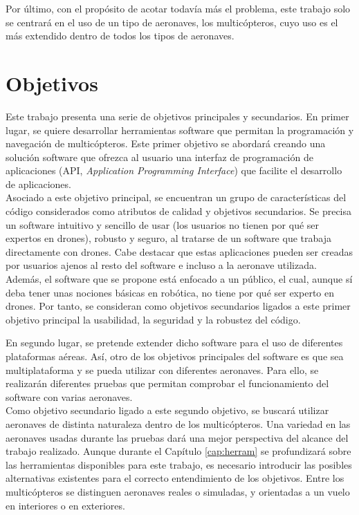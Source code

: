 \documentclass[../main.tex]{subfiles}
\begin{document}
Por último, con el propósito de acotar todavía más el problema, este trabajo solo se centrará en el uso de un tipo de aeronaves, los multicópteros, cuyo uso es el más extendido dentro de todos los tipos de aeronaves.

\section{Objetivos} \label{section:intro-objetivos}
Este trabajo presenta una serie de objetivos principales y secundarios. En primer lugar, se quiere desarrollar herramientas software que permitan la programación y navegación de multicópteros. Este primer objetivo se abordará creando una solución software que ofrezca al usuario una interfaz de programación de aplicaciones (API, \emph{Application Programming Interface}) que facilite el desarrollo de aplicaciones. \\
Asociado a este objetivo principal, se encuentran un grupo de características del código considerados como atributos de calidad y objetivos secundarios. Se precisa un software intuitivo y sencillo de usar (los usuarios no tienen por qué ser expertos en drones), robusto y seguro, al tratarse de un software que trabaja directamente con drones. Cabe destacar que estas aplicaciones pueden ser creadas por usuarios ajenos al resto del software e incluso a la aeronave utilizada. Además, el software que se propone está enfocado a un público, el cual, aunque sí deba tener unas nociones básicas en robótica, no tiene por qué ser experto en drones. Por tanto, se consideran como objetivos secundarios ligados a este primer objetivo principal la usabilidad, la seguridad y la robustez del código.

En segundo lugar, se pretende extender dicho software para el uso de diferentes plataformas aéreas. Así, otro de los objetivos principales del software es que sea multiplataforma y se pueda utilizar con diferentes aeronaves. Para ello, se realizarán diferentes pruebas que permitan comprobar el funcionamiento del software con varias aeronaves. \\
Como objetivo secundario ligado a este segundo objetivo, se buscará utilizar aeronaves de distinta naturaleza dentro de los multicópteros. Una variedad en las aeronaves usadas durante las pruebas dará una mejor perspectiva del alcance del trabajo realizado. Aunque durante el Capítulo  \ref{cap:herram} se profundizará sobre las herramientas disponibles para este trabajo, es necesario introducir las posibles alternativas existentes para el correcto entendimiento de los objetivos. Entre los multicópteros se distinguen aeronaves reales o simuladas, y orientadas a un vuelo en interiores o en exteriores.
\end{document}
